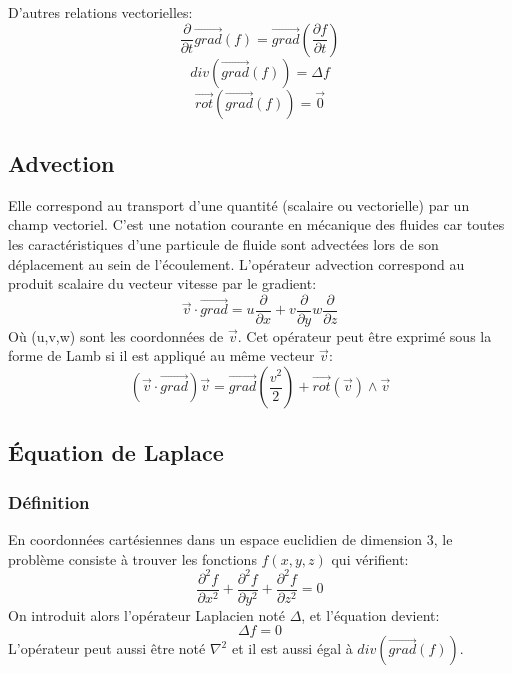 \documentclass[10pt,a4paper]{article}
\begin{document}
D'autres relations vectorielles:
\begin{equation}
\frac{\partial}{\partial t}\overrightarrow{grad}(f) = \overrightarrow{grad}(\frac{\partial f}{\partial t})
\end{equation}
\begin{equation}
div(\overrightarrow{grad}(f)) = \Delta f
\end{equation}
\begin{equation}
\overrightarrow{rot}(\overrightarrow{grad}(f)) = \overrightarrow{0}
\end{equation}

\subsection{Advection\cite{advection}}
Elle correspond au transport d'une quantité (scalaire ou vectorielle) par un champ vectoriel. C'est une notation courante en mécanique des fluides car toutes les caractéristiques d'une particule de fluide sont advectées lors de son déplacement au sein de l'écoulement. L'opérateur advection correspond au produit scalaire du vecteur vitesse par le gradient:
\begin{equation}
\overrightarrow{v}\cdot\overrightarrow{grad} = u\frac{\partial}{\partial x} + v\frac{\partial}{\partial y} w\frac{\partial}{\partial z}
\end{equation}
Où (u,v,w) sont les coordonnées de $\overrightarrow{v}$. Cet opérateur peut être exprimé sous la forme de Lamb si il est appliqué au même vecteur $\overrightarrow{v}$:
\begin{equation}
(\overrightarrow{v}\cdot\overrightarrow{grad})\overrightarrow{v} = \overrightarrow{grad}(\frac{v^{2}}{2}) + \overrightarrow{rot}(\overrightarrow{v}) \land \overrightarrow{v}
\end{equation}


\subsection{Équation de Laplace \cite{eqlaplace}}
\subsubsection{Définition}
En coordonnées cartésiennes dans un espace euclidien de dimension 3, le problème consiste à trouver les fonctions $f(x,y,z)$ qui vérifient:
\begin{equation}
\frac{\partial^{2} f}{\partial x^{2}} + \frac{\partial^{2} f}{\partial y^{2}} + \frac{\partial^{2} f}{\partial z^{2}} = 0
\end{equation}
On introduit alors l'opérateur Laplacien noté $\Delta$, et l'équation devient:
\begin{equation}
\Delta f = 0
\end{equation}
L'opérateur peut aussi être noté $\nabla^{2}$ et il est aussi égal à $div(\overrightarrow{grad}(f))$.
\end{document}

